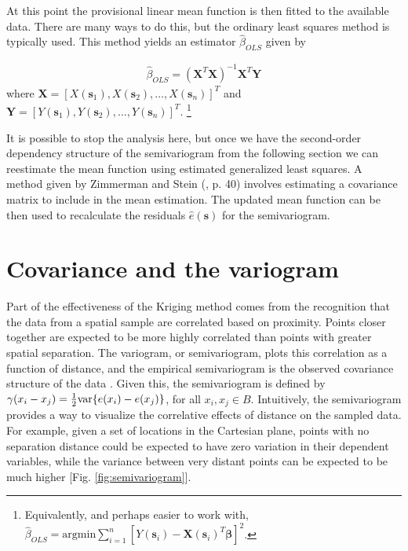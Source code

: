 \documentclass[12pt,twoside]{reedthesis}
\begin{document}
At this point the provisional linear mean function is then fitted to the available data. There are many ways to do this, but the ordinary least squares method is typically used. This method yields an estimator $\hat\beta_{OLS}$ given by 

\begin{align*}
\hat\beta_{OLS} = (\mathbf{X}^T\mathbf{X})^{-1}\mathbf{X}^T\mathbf{Y} 
\end{align*} 
where $\mathbf{X} = [X(\mathbf{s}_1), X(\mathbf{s}_2), \dots, X(\mathbf{s}_n)]^T$ and $\mathbf{Y} = [Y(\mathbf{s}_1), Y(\mathbf{s}_2), \dots, Y(\mathbf{s}_n)]^T$. \footnote{Equivalently, and perhaps easier to work with, $\hat\beta_{OLS} = \text{argmin}\sum_{i=1}^n[Y(\mathbf{s}_i) - \mathbf{X}(\mathbf{s}_i)^T\mathbf{\beta}]^2$.} 

It is possible to stop the analysis here, but once we have the second-order dependency structure of the semivariogram from the following section we can reestimate the mean function using estimated generalized least squares. A method given by Zimmerman and Stein (\cite{gelfand:2010}, p. 40) involves estimating a covariance matrix to include in the mean estimation. The updated mean function can be then used to recalculate the residuals $\hat e(\mathbf{s})$ for the semivariogram.


\section{Covariance and the variogram}
Part of the effectiveness of the Kriging method comes from the recognition that the data from a spatial sample are correlated based on proximity. Points closer together are expected to be more highly correlated than points with greater spatial separation. The variogram, or semivariogram, plots this correlation as a function of distance, and the empirical semivariogram is the observed covariance structure of the data \cite{gelfand:2010}. Given this, the semivariogram is defined by $\gamma(x_i - x_j) = {1\over 2} \text{var} \{ e(x_i) - e(x_j) \}$, for all $x_i, x_j \in B$. Intuitively, the semivariogram provides a way to visualize the correlative effects of distance on the sampled data. For example, given a set of locations in the Cartesian plane, points with no separation distance could be expected to have zero variation in their dependent variables, while the variance between very distant points can be expected to be much higher [Fig. \ref{fig:semivariogram}]. 
\end{document}
